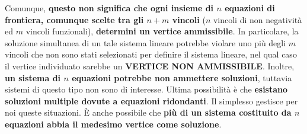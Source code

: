 \documentclass[12pt]{article}
\begin{document}
Comunque, \textbf{questo non significa che ogni insieme di $n$ equazioni di frontiera, comunque scelte tra gli $n+m$ vincoli} ($n$ vincoli di non negatività ed $m$ vincoli funzionali), \textbf{determini un vertice ammissibile}.
In particolare, la soluzione simultanea di un tale sistema lineare potrebbe violare uno più degli $m$ vincoli che non sono stati selezionati per definire il sistema lineare, nel qual caso il vertice individuato sarebbe un \textbf{VERTICE NON AMMISSIBILE}.
Inoltre, \textbf{un sistema di $n$ equazioni potrebbe non ammettere soluzioni}, tuttavia sistemi di questo tipo non sono di interesse.
Ultima possibilità è che \textbf{esistano soluzioni multiple dovute a equazioni ridondanti}. Il simplesso gestisce per noi queste situazioni.
È anche possibile che \textbf{più di un sistema costituito da $n$ equazioni abbia il medesimo vertice come soluzione}.
\end{document}

